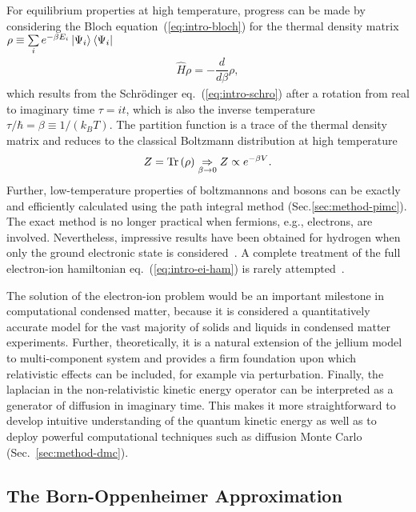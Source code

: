 For equilibrium properties at high temperature, progress can be made by considering the Bloch equation~(\ref{eq:intro-bloch}) for the thermal density matrix $\rho\equiv\sum\limits_i e^{-\beta E_i} \ket{\Psi_i}\bra{\Psi_i}$
\begin{align} \label{eq:intro-bloch}
\hat{H} \rho = -\dfrac{d}{d\beta}\rho,
\end{align}
which results from the Schr\"odinger eq.~(\ref{eq:intro-schro}) after a rotation from real to imaginary time $\tau = it$, which is also the inverse temperature $\tau/\hbar=\beta\equiv1/(k_BT)$.
The partition function is a trace of the thermal density matrix and reduces to the classical Boltzmann distribution at high temperature
\begin{align}
Z=\text{Tr}\left(\rho\right) \underset{\beta\rightarrow 0}{\Rightarrow} Z \propto e^{-\beta V}.
\end{align}
Further, low-temperature properties of boltzmannons and bosons can be exactly and efficiently calculated using the path integral method (Sec.\ref{sec:method-pimc}). The exact method is no longer practical when fermions, e.g., electrons, are involved. Nevertheless, impressive results have been obtained for hydrogen when only the ground electronic state is considered~\cite{Pierleoni2016b,Celliers2018}.
A complete treatment of the full electron-ion hamiltonian eq.~(\ref{eq:intro-ei-ham}) is rarely attempted~\cite{Ceperley1981,Natoli1995}.

The solution of the electron-ion problem would be an important milestone in computational condensed matter, because it is considered a quantitatively accurate model for the vast majority of solids and liquids in condensed matter experiments. Further, theoretically, it is a natural extension of the jellium model to multi-component system and provides a firm foundation upon which relativistic effects can be included, for example via perturbation. Finally, the laplacian in the non-relativistic kinetic energy operator can be interpreted as a generator of diffusion in imaginary time. This makes it more straightforward to develop intuitive understanding of the quantum kinetic energy as well as to deploy powerful computational techniques such as diffusion Monte Carlo (Sec.~\ref{sec:method-dmc}).

\subsection{The Born-Oppenheimer Approximation}

